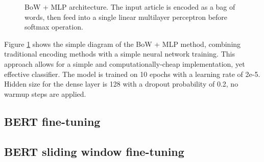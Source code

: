 \begin{figure}[htbp]
    \centering
    \caption{BoW + MLP architecture. The input article is encoded as a bag of words, then feed into a single linear multilayer perceptron before softmax operation.}
    \label{fig:bow_mlp_architecture}
\end{figure}

Figure \ref{fig:bow_mlp_architecture} shows the simple diagram of the BoW + MLP method, combining traditional encoding methods with a simple neural network training. This approach allows for a simple and computationally-cheap implementation, yet effective classifier. The model is trained on 10 epochs with a learning rate of 2e-5. Hidden size for the dense layer is 128 with a dropout probability of 0.2, no warmup steps are applied.

\subsection{BERT fine-tuning}

\subsection{BERT sliding window fine-tuning}

